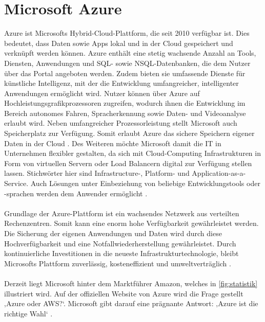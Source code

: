 \section{Microsoft Azure}
 Azure ist Microsofts Hybrid-Cloud-Plattform, die seit 2010 verfügbar ist. Dies bedeutet, dass Daten sowie Apps lokal und in der Cloud gespeichert und verknüpft werden können. Azure enthält eine stetig wachsende Anzahl an Tools, Diensten, Anwendungen und SQL- sowie NSQL-Datenbanken, die dem Nutzer über das Portal angeboten werden. Zudem bieten sie umfassende Dienste für künstliche Intelligenz, mit der die Entwicklung umfangreicher, intelligenter Anwendungen ermöglicht wird.  Nutzer können über Azure auf Hochleistungsgrafikprozessoren zugreifen, wodurch ihnen die Entwicklung im Bereich autonomes Fahren, Spracherkennung sowie Daten- und Videoanalyse erlaubt wird. Neben umfangreicher Prozessorleistung stellt Microsoft auch Speicherplatz zur Verfügung. Somit erlaubt Azure das sichere Speichern eigener Daten in der Cloud \cite{Sicherheit.2017b}. Des Weiteren möchte Microsoft damit die IT in Unternehmen flexibler gestalten, da sich mit Cloud-Computing Infrastrukturen in Form von virtuellen Servern oder Load Balancern digital zur Verfügung stellen lassen. Stichwörter hier sind Infrastructure-, Platform- und Application-as-a-Service. Auch Lösungen unter Einbeziehung von beliebige Entwicklungstools oder -sprachen werden dem Anwender ermöglicht \cite{Klein.2017}. \\ \\
Grundlage der Azure-Plattform ist ein wachsendes Netzwerk aus verteilten Rechenzentren. Somit kann eine enorm hohe Verfügbarkeit gewährleistet werden. Die Sicherung der eigenen Anwendungen und Daten wird durch diese Hochverfügbarkeit und eine Notfallwiederherstellung gewährleistet. Durch kontinuierliche Investitionen in die neueste Infrastrukturtechnologie, bleibt Microsofts Plattform zuverlässig, kosteneffizient und umweltverträglich \cite{Klein.2017}.\\ \\
Derzeit liegt Microsoft hinter dem Marktführer Amazon, welches in \ref{fig:statistik} illustriert wird. Auf der offiziellen Website von Azure wird die Frage gestellt ‚Azure oder AWS?‘. Microsoft gibt darauf eine prägnante Antwort: ‚Azure ist die richtige Wahl‘ \cite{Microsoft.2017}.
